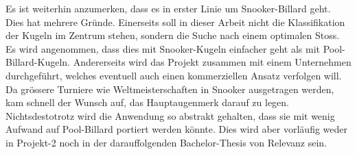 Es ist weiterhin anzumerken, dass es in erster Linie um Snooker-Billard geht. Dies hat mehrere Gründe. Einerseits soll
in dieser Arbeit nicht die Klassifikation der Kugeln im Zentrum stehen, sondern die Suche nach einem optimalen Stoss.
Es wird angenommen, dass dies mit Snooker-Kugeln einfacher geht als mit Pool-Billard-Kugeln. Andererseits wird das
Projekt zusammen mit einem Unternehmen durchgeführt, welches eventuell auch einen kommerziellen Ansatz verfolgen
will. Da grössere Turniere wie Weltmeisterschaften in Snooker ausgetragen werden, kam schnell der Wunsch auf, das
Hauptaugenmerk darauf zu legen. Nichtsdestotrotz wird die Anwendung so abstrakt gehalten, dass sie mit wenig Aufwand
auf Pool-Billard portiert werden könnte. Dies wird aber vorläufig weder in Projekt-2 noch in der darauffolgenden
Bachelor-Thesis von Relevanz sein.

